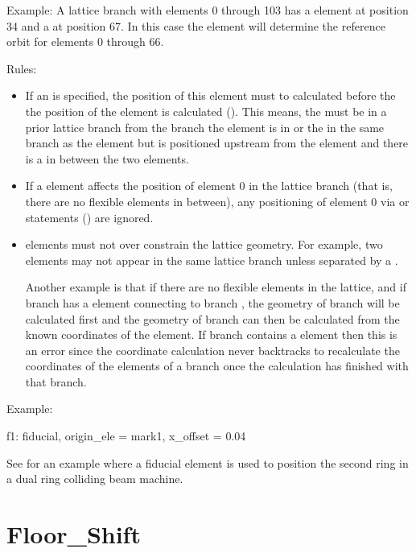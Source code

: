 Example: A lattice branch with elements 0 through 103 has a
 element at position 34 and a   at
position 67. In this case the  element will determine the
reference orbit for elements 0 through 66.

Rules: 
  \begin{itemize}
  \item
If an  is specified, the position of this element must
to calculated before the the position of the  element is
calculated (). This means, the  must be in
a prior lattice branch from the branch the  element is in
or the  in the same branch as the  element
but is positioned upstream from the  element and there is
a   in between the two elements.
  \item
If a  element affects the position of element 0 in the
lattice branch (that is, there are no flexible  elements
in between), any positioning of element 0 via  or
 statements () are ignored.
  \item
{} elements must not over constrain the lattice geometry.
For example, two  elements may not appear in the same
lattice branch unless separated by a  . 

Another example is that if there are no flexible  elements
in the lattice, and if branch  has a  element
connecting to branch , the geometry of branch  will be
calculated first and the geometry of branch  can then be
calculated from the known coordinates of the  element. If
branch  contains a  element then this is an error
since the coordinate calculation never backtracks to recalculate the
coordinates of the elements of a branch once the calculation has
finished with that branch.
  \end{itemize}

Example:
\begin{example}
  f1: fiducial, origin_ele = mark1, x_offset = 0.04
\end{example}
See  for an example where a fiducial element is
used to position the second ring in a dual ring colliding beam 
machine.

\section{Floor_Shift}
\label{s:floor.ele}

